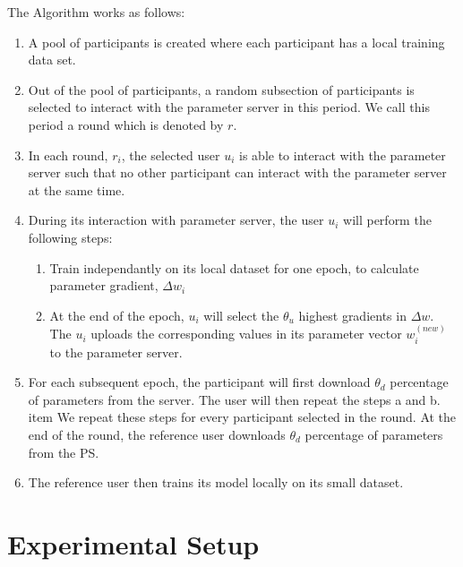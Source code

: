\documentclass[conference]{IEEEtran}
\begin{document}
The Algorithm works as follows:
\begin {enumerate}
\item A pool of participants is created where each participant has a local training data set. 
\item Out of the pool of participants, a random subsection of participants is selected to interact with the parameter server in this
period. We call this period a round which is denoted by $r$. 
\item In each round, $r_i$, the selected user $u_i$ is able to interact with the parameter server such that no other
participant can interact with the parameter server at the same time.
\item During its interaction with parameter server, the user $u_i$ will perform the following steps:
\begin {enumerate}
  \item Train independantly on its local dataset for one epoch, to calculate parameter gradient, $\Delta w_i$ 
  \item  At the end of the epoch, $u_i$ will select the $\theta_u$ highest gradients in $\Delta w$. The $u_i$ uploads the corresponding
values in its parameter vector $w_i^{(new)}$  to the parameter server.
  \end {enumerate}
\item For each subsequent epoch, the participant will first download $\theta_d$ percentage of parameters from the server. The
user will then repeat the steps a and b. item We repeat these steps for every participant selected in the round. At the end of
the round, the reference user downloads $\theta_d$ percentage of parameters from the PS.
\item The reference user then trains its model locally on its small dataset. 
\end {enumerate}




\section{Experimental Setup}
\end{document}
